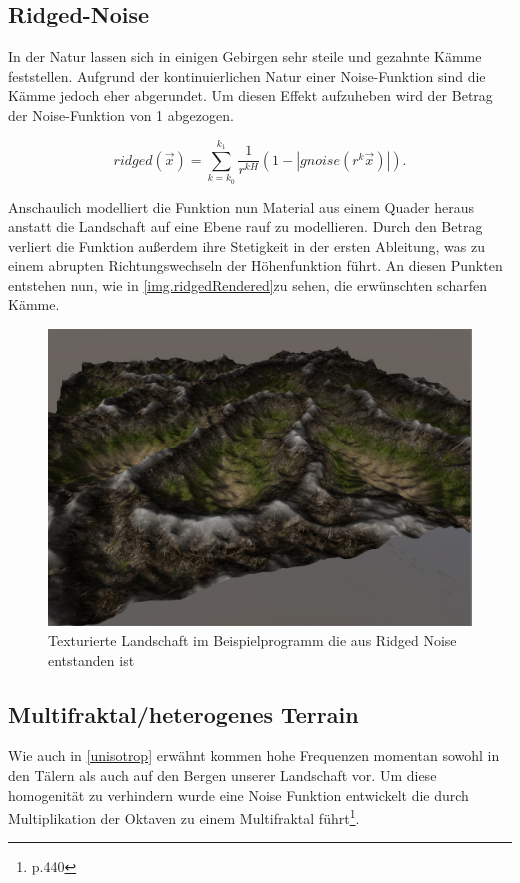 \subsection{Ridged-Noise}
In der Natur lassen sich in einigen Gebirgen sehr steile und gezahnte Kämme feststellen. Aufgrund der kontinuierlichen Natur einer Noise-Funktion sind die Kämme jedoch eher abgerundet. 
Um diesen Effekt aufzuheben wird der Betrag der Noise-Funktion von 1 abgezogen. 

\begin{equation} \label{eq.ridgedNoise}
ridged(\vec{x}) = \sum_{k=k_0}^{k_1}\frac{1}{r^{kH}}(1-\left|gnoise(r^k\vec{x})\right|).
\end{equation}

Anschaulich modelliert die Funktion nun Material aus einem Quader heraus anstatt die Landschaft auf eine Ebene rauf zu modellieren. Durch den Betrag verliert die Funktion außerdem ihre Stetigkeit in der ersten Ableitung, was zu einem abrupten Richtungswechseln der Höhenfunktion führt. An diesen Punkten entstehen nun, wie in \autoref{img.ridgedRendered}zu sehen, die erwünschten scharfen Kämme.

\begin{figure}[!hbtp]%
	\centering
	\includegraphics[width=\textwidth]{images/ridged_rendered.png}
	\caption{Texturierte Landschaft im Beispielprogramm die aus Ridged Noise entstanden ist}\label{img.ridgedRendered}
\end{figure}



\subsection{Multifraktal/heterogenes Terrain}
Wie auch in \ref{unisotrop} erwähnt kommen hohe Frequenzen momentan sowohl in den Tälern als auch auf den Bergen unserer Landschaft vor. Um diese homogenität zu verhindern wurde eine Noise Funktion entwickelt die durch Multiplikation der Oktaven zu einem Multifraktal führt\footnote{\cite{texturingAndModeling} p.440}. 


